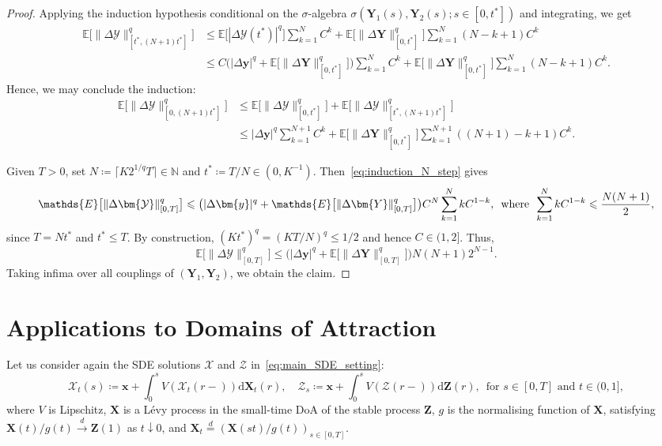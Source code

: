 \documentclass[en,oneside,bbfont,article]{amsart}
\theoremstyle{remark}
\theoremstyle{definition}
\theoremstyle{definition}
\newcommand\N{\mathbb{N}}
\newcommand\X{\bm{\mathcal{X}}}
\newcommand\Y{\bm{\mathcal{Y}}}
\newcommand\ZZ{\bm{\mathcal{Z}}}
\newcommand\E{\mathds{E}}
\newcommand\1{\mathds{1}}
\newcommand\da{\downarrow}
\renewcommand\le{\leqslant}
\newcommand\eqd{\overset{d}{=}}
\newcommand\cid{\xrightarrow{d}}
\newcommand{\D}{\mathrm{d}}
\newcommand{\ceil}[1]{\lceil#1\rceil}
\begin{document}
\begin{proof}
Applying the induction hypothesis conditional on the $\sigma$-algebra $\sigma(\bm{Y}_1(s),\bm{Y}_2(s);s\in[0,t^*])$ and integrating, we get
\begin{align*}
\E\big[\|\Delta\Y\|_{[t^*,(N+1)t^*]}^q\big]
&\le\E\big[|\Delta\Y(t^*)|^q\big] \sum_{k=1}^N C^k 
+\E\big[\|\Delta\bm{Y}\|_{[0,t^*]}^q\big]\sum_{k=1}^N (N-k+1)C^k\\
&\le C\big(|\Delta\bm{y}|^q + \E\big[\|\Delta\bm{Y}\|_{[0,t^*]}^q\big]\big) \sum_{k=1}^N C^k 
+\E\big[\|\Delta\bm{Y}\|_{[0,t^*]}^q\big]\sum_{k=1}^N (N-k+1)C^k.
\end{align*}
Hence, we may conclude the induction:
\begin{align*}
\E\big[\|\Delta\Y\|_{[0,(N+1)t^*]}^q\big]
&\le \E\big[\|\Delta\Y\|_{[0,t^*]}^q\big]
+ \E\big[\|\Delta\Y\|_{[t^*,(N+1)t^*]}^q\big]\\
&\le |\Delta\bm{y}|^q \sum_{k=1}^{N+1} C^{k}
+ \E\big[\|\Delta\bm{Y}\|_{[0,t^*]}^q\big] \sum_{k=1}^{N+1} ((N+1)-k+1)C^k.
\end{align*} 

Given $T>0$, set $N \coloneqq \ceil{K2^{1/q}T} \in \N$ and $t^*\coloneqq T/N \in (0,K^{-1})$. Then~\eqref{eq:induction_N_step} gives
\[
\E\big[\|\Delta\Y\|_{[0,T]}^q\big]
\le\big(|\Delta\bm{y}|^q 
    + \E\big[\|\Delta\bm{Y}\|_{[0,T]}^q\big]\big) C^{N} 
\sum_{k=1}^N kC^{1-k},
\enskip\text{where}\enskip
\sum_{k=1}^N kC^{1-k}
\le \frac{N(N+1)}{2},
\]
since $T=Nt^*$ and $t^*\le T$. By construction, $(Kt^*)^q=(KT/N)^q \le 1/2$ and hence $C \in (1,2]$. Thus, 
\begin{equation*}
\E\big[\|\Delta\Y\|_{[0,T]}^q\big]
\le \big(|\Delta\bm{y}|^q +\E\big[\|\Delta\bm{Y}\|_{[0,T]}^q\big]\big) N(N+1) 2^{N-1}. 
\end{equation*}
Taking infima over all couplings of $(\bm{Y}_1,\bm{Y}_2)$, we obtain the claim.
\end{proof}


\section{Applications to Domains of Attraction}
\label{sec:application_DoA} 
Let us consider again the SDE solutions $\X$ and $\ZZ$ in~\eqref{eq:main_SDE_setting}:
\begin{equation*}
\X_t(s)\coloneqq \bm{x}+\int_0^s V(\X_t(r-))\D \bm{X}_t(r), \quad 
\ZZ_s\coloneqq \bm{x}+\int_0^s V(\ZZ(r-))\D \bm{Z}(r), \, \text{ for }s \in [0,T] \text{ and }t \in (0,1],
\end{equation*}
where $V$ is Lipschitz, $\bm{X}$ is a L\'evy process in the small-time DoA of the stable process $\bm{Z}$, $g$ is the normalising function of $\bm{X}$, satisfying $\bm{X}(t)/g(t)\cid \bm{Z}(1)$ as $t\da 0$, and $\bm{X}_t\eqd (\bm{X}(st)/g(t))_{s\in[0,T]}$.
\end{document}
